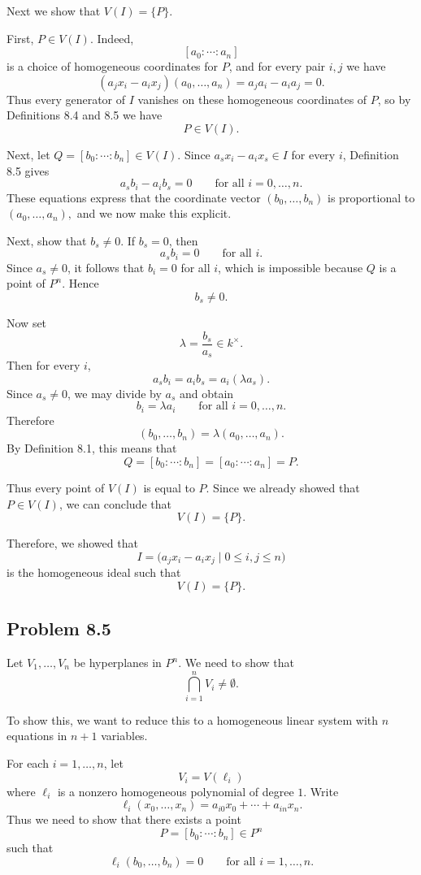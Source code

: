 \documentclass[a4paper,12pt]{article}
\theoremstyle{plain}
\theoremstyle{definition}
\theoremstyle{remark}
\begin{document}
\medskip

Next we show that $V(I)=\{P\}$.

First, $P\in V(I)$. Indeed,
\[
[a_0:\cdots:a_n]
\]
is a choice of homogeneous coordinates for $P$, and for every pair $i,j$ we have
\[
(a_jx_i-a_ix_j)(a_0,\dots,a_n)=a_ja_i-a_ia_j=0.
\]
Thus every generator of $I$ vanishes on these homogeneous coordinates of $P$, so by Definitions 8.4 and 8.5 we have
\[
P\in V(I).
\]

\medskip

Next, let
$
Q=[b_0:\cdots:b_n]\in V(I).$
Since
$
a_sx_i-a_ix_s\in I
$
for every $i$, Definition 8.5 gives
\[
a_sb_i-a_ib_s=0
\qquad\text{for all } i=0,\dots,n.
\]
These equations express that the coordinate vector
$
(b_0,\dots,b_n)
$
is proportional to
$
(a_0,\dots,a_n),
$
and we now make this explicit.

Next, show that $b_s\neq 0$. If $b_s=0$, then
\[
a_sb_i=0
\qquad\text{for all } i.
\]
Since $a_s\neq 0$, it follows that $b_i=0$ for all $i$, which is impossible because $Q$ is a point of $P^n$.
Hence
\[
b_s\neq 0.
\]

Now set
\[
\lambda=\frac{b_s}{a_s}\in k^\times.
\]
Then for every $i$,
\[
a_sb_i=a_ib_s=a_i(\lambda a_s).
\]
Since $a_s\neq 0$, we may divide by $a_s$ and obtain
\[
b_i=\lambda a_i
\qquad\text{for all } i=0,\dots,n.
\]
Therefore
\[
(b_0,\dots,b_n)=\lambda(a_0,\dots,a_n).
\]
By Definition 8.1, this means that
\[
Q=[b_0:\cdots:b_n]=[a_0:\cdots:a_n]=P.
\]

Thus every point of $V(I)$ is equal to $P$. Since we already showed that $P\in V(I)$, we can conclude that
\[
V(I)=\{P\}.
\]

Therefore, we showed that 
\[
I=\bigl(a_jx_i-a_ix_j \mid 0\le i,j\le n\bigr)
\] 
is the homogeneous ideal such that \[
V(I)=\{P\}.
\]



\subsection*{Problem 8.5}

Let $V_1,\dots,V_n$ be hyperplanes in $P^n$. We need to show that
\[
\bigcap_{i=1}^n V_i\neq \emptyset.
\]

\medskip

To show this, we want to reduce this to a homogeneous linear system with $n$ equations in $n+1$ variables.

For each $i=1,\dots,n$, let
\[
V_i=V(\ell_i)
\]
where $\ell_i$ is a nonzero homogeneous polynomial of degree $1$. Write
\[
\ell_i(x_0,\dots,x_n)=a_{i0}x_0+\cdots+a_{in}x_n.
\]
Thus we need to show that there exists a point
\[
P=[b_0:\cdots:b_n]\in P^n
\]
such that
\[
\ell_i(b_0,\dots,b_n)=0
\qquad\text{for all } i=1,\dots,n.
\]
\end{document}

